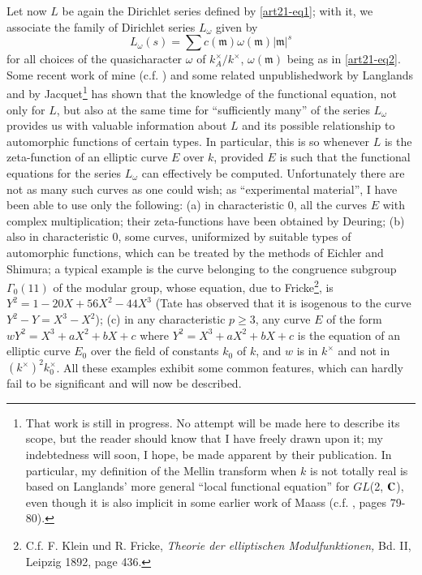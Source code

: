 Let now $L$ be again the Dirichlet series defined by \eqref{art21-eq1}; with it, we associate the family of Dirichlet series $L_{\omega}$ given by
\begin{equation}
L_{\omega}(s)=\sum c(\mathfrak{m})\omega(\mathfrak{m})|\mathfrak{m}|^{s}\label{art21-eq4}
\end{equation}
for all choices of the quasicharacter $\omega$ of $k^{\times}_{A}/k^{\times}$, $\omega(\mathfrak{m})$ being as in \eqref{art21-eq2}. Some recent work of mine (c.f. \cite{art21-key2}) and some related unpublished\pageoriginale work by Langlands and by Jacquet\footnote[2]{That work is still in progress. No attempt will be made here to describe its scope, but the reader should know that I have freely drawn upon it; my indebtedness will soon, I hope, be made apparent by their publication. In particular, my definition of the Mellin transform when $k$ is not totally real is based on Langlands' more general ``local functional equation'' for $GL$(2, $\mathbf{C}$), even though it is also implicit in some earlier work of Maass (c.f. \cite{art21-key1}, pages 79-80).} has shown that the knowledge of the functional equation, not only for $L$, but also at the same time for ``sufficiently many'' of the series $L_{\omega}$ provides us with valuable information about $L$ and its possible relationship to automorphic functions of certain types. In particular, this is so whenever $L$ is the zeta-function of an elliptic curve $E$ over $k$, provided $E$ is such that the functional equations for the series $L_{\omega}$ can effectively be computed. Unfortunately there are not as many such curves as one could wish; as ``experimental material'', I have been able to use only the following: (a) in characteristic $0$, all the curves $E$ with complex multiplication; their zeta-functions have been obtained by Deuring; (b) also in characteristic 0, some curves, uniformized by suitable types of automorphic functions, which can be treated by the methods of Eichler and Shimura; a typical example is the curve belonging to the congruence subgroup $\Gamma_{0}(11)$ of the modular group, whose equation, due to Fricke\footnote[3]{C.f. F. Klein und R. Fricke, {\em Theorie der elliptischen Modulfunktionen,} Bd. II, Leipzig 1892, page 436.}, is $Y^{2}=1-20X+56X^{2}-44X^{3}$ (Tate has observed that it is isogenous to the curve $Y^{2}-Y=X^{3}-X^{2}$); (c) in any characteristic $p\geq 3$, any curve $E$ of the form $wY^{2}=X^{3}+aX^{2}+bX+c$ where $Y^{2}=X^{3}+aX^{2}+bX+c$ is the equation of an elliptic curve $E_{0}$ over the field of constants $k_{0}$ of $k$, and $w$ is in $k^{\times}$ and not in $(k^{\times})^{2}k^{\times}_{0}$. All these examples exhibit some common features, which can hardly fail to be significant and will now be described.

